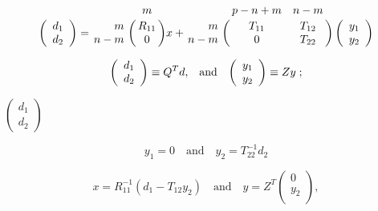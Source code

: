 {\newpage\clearpage
{}%
\begin{displaymath}
\left( \begin{array}{c}
   d_1 \\
   d_2
   \end{array} \right) =
\bordermatrix{    &  m  \cr
       \hfill  m  & R_{11}   \cr
               n-m & 0     } x +
\bordermatrix{      & p-n+m  & n-m   \cr
       \hfill  m    & T_{11} & T_{12}   \cr
               n-m  &   0    & T_{22}   } \left( \begin{array}{c}
                                            y_1 \\
                                            y_2 \\
                                            \end{array} \right) 
\end{displaymath}%
\lthtmldisplayZ
\lthtmlcheckvsize\clearpage}

{\newpage\clearpage
{}%
\begin{displaymath}
\left( \begin{array}{c}
            d_1  \\
            d_2 \\
            \end{array} \right) \equiv Q^T d, \; \; \; {\rm and} \; \; \;
\left( \begin{array}{c}
            y_1  \\
            y_2 \\
            \end{array} \right) \equiv Z y \; ;
\end{displaymath}%
\lthtmldisplayZ
\lthtmlcheckvsize\clearpage}

{\newpage\clearpage
{}%
$\left( \begin{array}{c} d_1 \\d_2 \end{array} \right) $%
\lthtmlinlinemathZ
\lthtmlcheckvsize\clearpage}

{\newpage\clearpage
{}%
\begin{displaymath}
y_1 = 0 \quad \mbox{and} \quad y_2 = T^{-1}_{22} d_2
\end{displaymath}%
\lthtmldisplayZ
\lthtmlcheckvsize\clearpage}

{\newpage\clearpage
{}%
\begin{displaymath}
x = R^{-1}_{11}(d_1 - T_{12} y_2) \quad \mbox{and} \quad
y = Z^T \left( \begin{array}{c}
            0  \\
            y_2 \\
            \end{array} \right) ,
\end{displaymath}%
\lthtmldisplayZ
\lthtmlcheckvsize\clearpage}


